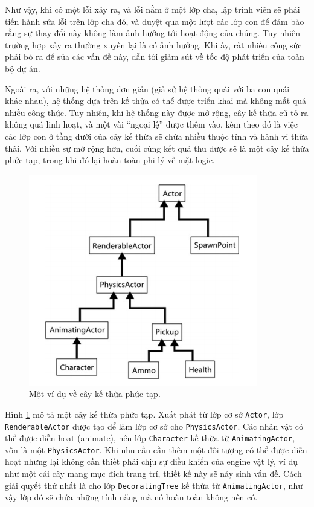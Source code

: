\documentclass[12pt]{report}
\begin{document}
Như vậy, khi có một lỗi xảy ra, và lỗi nằm ở một lớp cha, lập trình viên sẽ phải tiến hành sửa lỗi trên lớp cha đó, và duyệt qua một lượt các lớp con để đảm bảo rằng sự thay đổi này không làm ảnh hưởng tới hoạt động của chúng. Tuy nhiên trường hợp xảy ra thường xuyên lại là có ảnh hưởng. Khi ấy, rất nhiều công sức phải bỏ ra để sửa các vấn đề này, dẫn tới giảm sút về tốc độ phát triển của toàn bộ dự án.

Ngoài ra, với những hệ thống đơn giản (giả sử hệ thống quái với ba con quái khác nhau), hệ thống dựa trên kế thừa có thể được triển khai mà không mất quá nhiều công thức. Tuy nhiên, khi hệ thống này được mở rộng, cây kế thừa cũ tỏ ra không quá linh hoạt, và một vài ``ngoại lệ'' được thêm vào, kèm theo đó là việc các lớp con ở tầng dưới của cây kế thừa sẽ chứa nhiều thuộc tính và hành vi thừa thãi. Với nhiều sự mở rộng hơn, cuối cùng kết quả thu được sẽ là một cây kế thừa phức tạp, trong khi đó lại hoàn toàn phi lý về mặt logic.
\begin{figure}[H]
  \centering
    \includegraphics[width=10cm]{Pics/Chap4/inheritance.png}
  \caption{Một ví dụ về cây kế thừa phức tạp\cite{gamecodingcomplete}.} 
  \label{fig:hierarchy}
\end{figure}

Hình \ref{fig:hierarchy} mô tả một cây kế thừa phức tạp. Xuất phát từ lớp cơ sở \texttt{Actor}, lớp \texttt{RenderableActor} được tạo để làm lớp cơ sở cho \texttt{PhysicsActor}. Các nhân vật có thể được diễn hoạt (animate), nên lớp \texttt{Character} kế thừa từ \texttt{AnimatingActor}, vốn là một \texttt{PhysicsActor}. Khi nhu cầu cần thêm một đối tượng có thể được diễn hoạt nhưng lại không cần thiết phải chịu sự điều khiển của engine vật lý, ví dụ như một cái cây mang mục đích trang trí, thiết kế này sẽ nảy sinh vấn đề. Cách giải quyết thứ nhất là cho lớp \texttt{DecoratingTree} kế thừa từ \texttt{AnimatingActor}, như vậy lớp đó sẽ chứa những tính năng mà nó hoàn toàn không nên có. 
\end{document}
